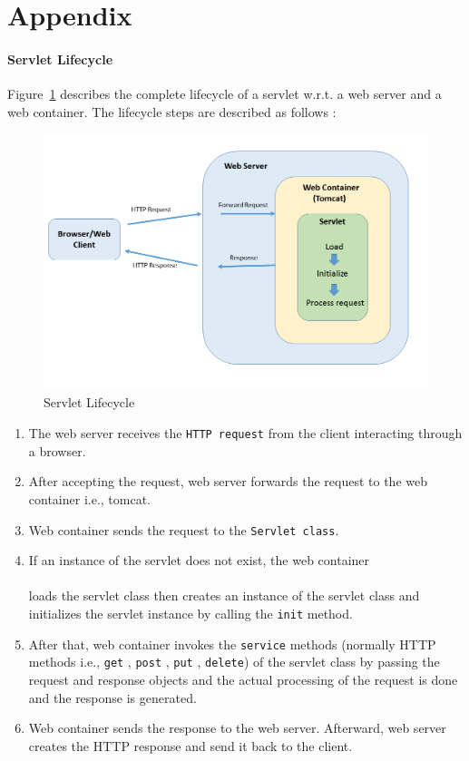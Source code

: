 \section{Appendix}\label{sec:Appendix}

\paragraph{Servlet Lifecycle}
Figure~\ref{fig:Server_Servlet} describes the complete lifecycle of a servlet w.r.t. a web server and a web container. The lifecycle steps are described as follows \cite{servlet}:

\begin{figure}[h]
	\includegraphics[width=1\textwidth]{figures/Server_Servlet}
	\caption{Servlet Lifecycle}
	\label{fig:Server_Servlet}
\end{figure}

\begin{enumerate}
	\item {The web server receives the \texttt{HTTP request} from the client interacting through a browser.}
	\item {After accepting the request, web server forwards the request to the web container i.e., tomcat.}
	\item {Web container sends the request to the \texttt{Servlet class}.}
	\item {If an instance of the servlet does not exist, the web container}\\\\
	loads the servlet class then creates an instance of the servlet class and initializes the servlet instance by calling the \texttt{init} method.
	\item {After that, web container invokes the \texttt{service} methods (normally HTTP methods i.e., \texttt{get} , \texttt{post} , \texttt{put} , \texttt{delete}) of the servlet class by passing the request and response objects and the actual processing of the request is done and the response is generated.}
	\item {Web container sends the response to the web server. Afterward, web server creates the HTTP response and send it back to the client.}
\end{enumerate}



